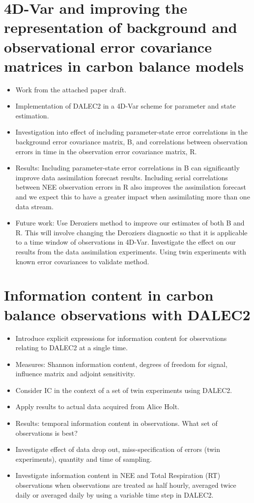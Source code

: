 \documentclass[11pt]{article}
\begin{document}
\section{4D-Var and improving the representation of background and observational error covariance matrices in carbon balance models}
\begin{itemize}
\item Work from the attached paper draft.
\item Implementation of DALEC2 in a 4D-Var scheme for parameter and state estimation.
\item Investigation into effect of including parameter-state error correlations in the background error covariance matrix, B, and correlations between observation errors in time in the observation error covariance matrix, R.
\item Results: Including parameter-state error correlations in B can significantly improve data assimilation forecast results. Including serial correlations between NEE observation errors in R also improves the assimilation forecast and we expect this to have a greater impact when assimilating more than one data stream.
\item Future work: Use Deroziers method to improve our estimates of both B and R. This will involve changing the Deroziers diagnostic so that it is applicable to a time window of observations in 4D-Var. Investigate the effect on our results from the data assimilation experiments. Using twin experiments with known error covariances to validate method.
\end{itemize}


\section{Information content in carbon balance observations with DALEC2}
\begin{itemize}
\item Introduce explicit expressions for information content for observations relating to DALEC2 at a single time.
\item Measures: Shannon information content, degrees of freedom for signal, influence matrix and adjoint sensitivity.
\item Consider IC in the context of a set of twin experiments using DALEC2.
\item Apply results to actual data acquired from Alice Holt.
\item Results: temporal information content in observations. What set of observations is best?
\item Investigate effect of data drop out, miss-specification of errors (twin experiments), quantity and time of sampling.
\item Investigate information content in NEE and Total Respiration (RT) observations when observations are treated as half hourly, averaged twice daily or averaged daily by using a variable time step in DALEC2.   
\end{itemize}
\end{document}
